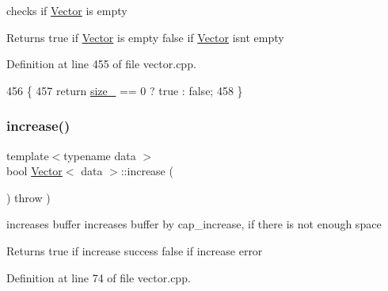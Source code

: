 checks if \hyperlink{classVector}{Vector} is empty 

\begin{DoxyReturn}{Returns}
true if \hyperlink{classVector}{Vector} is empty false if \hyperlink{classVector}{Vector} isn\textquotesingle{}t empty 
\end{DoxyReturn}


Definition at line 455 of file vector.\+cpp.


\begin{DoxyCode}
456     \{
457         \textcolor{keywordflow}{return} \hyperlink{classVector_a3c70fa478530a90177f2a7e7621ee688}{size\_} == 0 ? true : \textcolor{keyword}{false};
458     \}
\end{DoxyCode}
\mbox{\label{classVector_afa2a3c5660a7a34794975a6bb80d175f}} 
\subsubsection{\texorpdfstring{increase()}{increase()}}
{\footnotesize\ttfamily template$<$typename data $>$ \\
bool \hyperlink{classVector}{Vector}$<$ data $>$\+::increase (\begin{DoxyParamCaption}{ }\end{DoxyParamCaption}) throw  ) \hspace{0.3cm}{\ttfamily [private]}}



increases buffer  increases buffer by cap\+\_\+increase, if there is not enough space 

\begin{DoxyReturn}{Returns}
true if increase success false if increase error 
\end{DoxyReturn}


Definition at line 74 of file vector.\+cpp.


